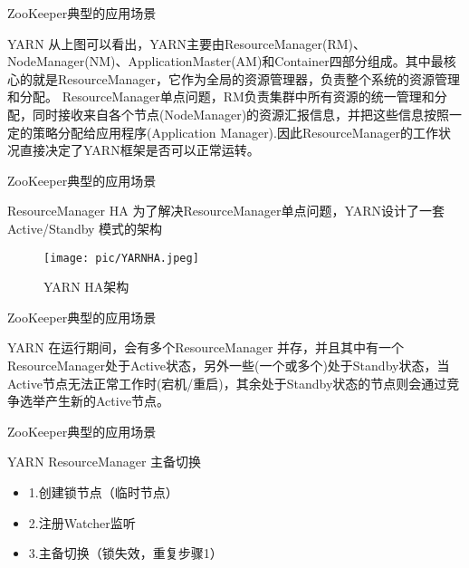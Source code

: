\documentclass[10pt]{beamer}
\begin{document}
\begin{frame}[fragile]{ZooKeeper典型的应用场景}
  \begin{alertblock}{YARN}
    从上图可以看出，YARN主要由ResourceManager(RM)、NodeManager(NM)、ApplicationMaster(AM)和Container四部分组成。其中最核心的就是ResourceManager，它作为全局的资源管理器，负责整个系统的资源管理和分配。\newline
    ResourceManager单点问题，RM负责集群中所有资源的统一管理和分配，同时接收来自各个节点(NodeManager)的资源汇报信息，并把这些信息按照一定的策略分配给应用程序(Application Manager).因此ResourceManager的工作状况直接决定了YARN框架是否可以正常运转。
  \end{alertblock}
\end{frame}

\begin{frame}[fragile]{ZooKeeper典型的应用场景}
  \begin{alertblock}{ResourceManager HA}
    为了解决ResourceManager单点问题，YARN设计了一套Active/Standby 模式的架构
    \newline
    \begin{figure}
      \texttt{[image: pic/YARNHA.jpeg]}
      \caption{YARN HA架构}
    \end{figure}
  \end{alertblock}
\end{frame}

\begin{frame}[fragile]{ZooKeeper典型的应用场景}
  \begin{alertblock}{YARN}
    在运行期间，会有多个ResourceManager 并存，并且其中有一个ResourceManager处于Active状态，另外一些(一个或多个)处于Standby状态，当Active节点无法正常工作时(宕机/重启)，其余处于Standby状态的节点则会通过竞争选举产生新的Active节点。
  \end{alertblock}
\end{frame}

\begin{frame}[fragile]{ZooKeeper典型的应用场景}
  \begin{alertblock}{YARN ResourceManager 主备切换}
    \begin{itemize}
      \item 1.创建锁节点（临时节点）
      \item 2.注册Watcher监听
      \item 3.主备切换（锁失效，重复步骤1）
    \end{itemize}
  \end{alertblock}
\end{frame}
\end{document}
